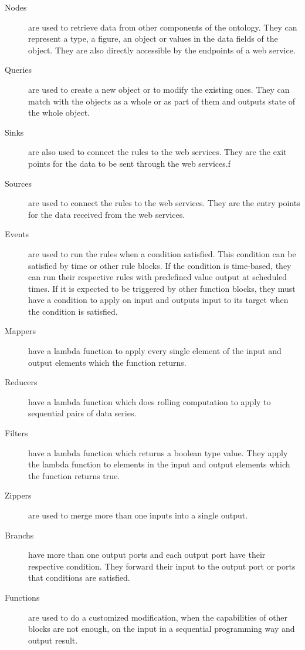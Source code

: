 \begin{description}
  \item [Nodes] are used to retrieve data from other components of the ontology. They can represent a type, a figure, an object or values in the data fields of the object. They are also directly accessible by the endpoints of a web service.
  \item [Queries] are used to create a new object or to modify the existing ones. They can match with the objects as a whole or as part of them and outputs state of the whole object. 
  \item [Sinks] are also used to connect the rules to the web services. They are the exit points for the data to be sent through the web services.f
  \item [Sources] are used to connect the rules to the web services. They are the entry points for the data received from the web services.
  \item [Events] are used to run the rules when a condition satisfied. This condition can be satisfied by time or other rule blocks. If the condition is time-based, they can run their respective rules with predefined value output at scheduled times. If it is expected to be triggered by other function blocks, they must have a condition to apply on input and outputs input to its target when the condition is satisfied.
  \item [Mappers] have a lambda function to apply every single element of the input and output elements which the function returns.
  \item [Reducers] have a lambda function which does rolling computation to apply to sequential pairs of data series.
  \item [Filters] have a lambda function which returns a boolean type value. They apply the lambda function to elements in the input and output elements which the function returns true.
  \item [Zippers] are used to merge more than one inputs into a single output.
  \item [Branchs] have more than one output ports and each output port have their respective condition. They forward their input to the output port or ports that conditions are satisfied.
  \item [Functions] are used to do a customized modification, when the capabilities of other blocks are not enough, on the input in a sequential programming way and output result.
\end{description}

